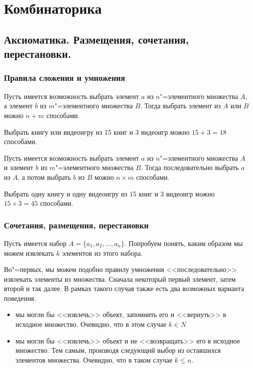 \section{Комбинаторика}

\subsection{Аксиоматика. Размещения, сочетания, перестановки.}

\subsubsection{Правила сложения и умножения}

\begin{theorem}
    Пусть имеется возможность выбрать элемент $a$ из $n$"=элементного
    множества $A$,
    а элемент $b$ из $m$"=элементного множества $B$. Тогда выбрать элемент 
    из $A$ или $B$ можно $n + m$ способами.
\end{theorem}

\begin{example}
    Выбрать книгу или видеоигру из 15 книг и 3 видеоигр можно 
    $15 + 3 = 18$ способами.
\end{example}

\begin{theorem}
    Пусть имеется возможность выбрать элемент $a$ из $n$"=элементного
    множества $A$ и элемент $b$  из $m$"=элементного множества $B$. 
    Тогда последовательно выбрать $a$ из $A$, а потом выбрать 
    $b$ из $B$ можно $n \times m$ способами.
\end{theorem}

\begin{example}
    Выбрать одну книгу и одну видеоигру из 15 книг и 3 видеоигр можно
    $15 \times 3 = 45$ способами.
\end{example}

\subsubsection{Сочетания, размещения, перестановки}
Пусть имеется набор $A = \{a_1, a_2, \dots, a_n\}$. Попробуем понять, 
каким образом мы можем извлекать $k$ элементов из этого набора.

Во"=первых, мы можем подобно правилу умножения <<последовательно>> извлекать 
элементы из множества. Сначала некоторый первый элемент, затем второй и так далее.
В рамках такого случая также есть два возможных варианта поведения.
\begin{itemize}
    \item мы могли бы <<извлечь>> объект, запомнить его и <<вернуть>> в исходное множество. Очевидно, что в этом случае $k \in N$
    \item мы могли бы <<извлечь>> объект и не <<возвращать>> его в исходное множество. Тем самым,
    производя следующий выбор из оставшихся элементов множества. Очевидно, что в таком случае
    $k \leq n$.
\end{itemize}

